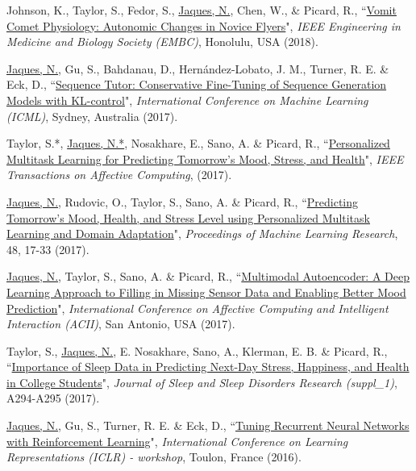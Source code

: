 \documentclass[paper=letter,fontsize=11pt]{scrartcl} %
\newcommand{\PaperEntry}[6]{
		\noindent #1, ``\href{#6}{#2}", \textit{#3}, #4 (#5).}
\begin{document}
\begin{etaremune}
\item \PaperEntry{Johnson, K., Taylor, S., Fedor, S., \underline{Jaques, N.}, Chen, W., \& Picard, R.}{Vomit Comet Physiology: Autonomic Changes in Novice Flyers}{IEEE Engineering in Medicine and Biology Society (EMBC)}{Honolulu, USA}{2018}{https://dspace.mit.edu/bitstream/handle/1721.1/123805/18.Johnson-etal_EMBC18_VomitComet.pdf?sequence=1&isAllowed=y}

\item \PaperEntry{\underline{Jaques, N.}, Gu, S., Bahdanau, D., Hern\'{a}ndez-Lobato, J. M., Turner, R. E. \& Eck, D.}{Sequence Tutor: Conservative Fine-Tuning of Sequence Generation Models with KL-control}{International Conference on Machine Learning (ICML)}{Sydney, Australia}{2017}{https://arxiv.org/pdf/1611.02796.pdf}

\item \PaperEntry{Taylor, S.*, \underline{Jaques, N.*}, Nosakhare, E., Sano, A. \& Picard, R.}{Personalized Multitask Learning for Predicting Tomorrow's Mood, Stress, and Health}{IEEE Transactions on Affective Computing}{}{2017}{https://www.media.mit.edu/publications/taffc-personalized-multitask-learning-for-predicting-tomorrow-s-mood-stress-and-health/}

\item \PaperEntry{\underline{Jaques, N.}, Rudovic, O., Taylor, S., Sano, A. \& Picard, R.}{Predicting Tomorrow’s Mood, Health, and Stress Level using Personalized Multitask Learning and Domain Adaptation}{Proceedings of Machine Learning Research}{48, 17-33}{2017}{http://proceedings.mlr.press/v66/jaques17a/jaques17a.pdf}

\item \PaperEntry{\underline{Jaques, N.}, Taylor, S., Sano, A. \& Picard, R.}{Multimodal Autoencoder: A Deep Learning Approach to Filling in Missing Sensor Data and Enabling Better Mood Prediction}{International Conference on Affective Computing and Intelligent Interaction (ACII)}{San Antonio, USA}{2017}{https://ieeexplore.ieee.org/document/8273601}

\item \PaperEntry{Taylor, S., \underline{Jaques, N.}, E. Nosakhare, Sano, A., Klerman, E. B. \& Picard, R.}{Importance of Sleep Data in Predicting Next-Day Stress, Happiness, and Health in College Students}{Journal of Sleep and Sleep Disorders Research (suppl\_1)}{A294-A295}{2017}{https://academic.oup.com/sleep/article-abstract/40/suppl_1/A294/3782233}

\item \PaperEntry{\underline{Jaques, N.}, Gu, S., Turner, R. E. \& Eck, D.}{Tuning Recurrent Neural Networks with Reinforcement Learning}{International Conference on Learning Representations (ICLR) - workshop}{Toulon, France}{2016}{https://openreview.net/pdf?id=Syyv2e-Kx}


\end{etaremune}
\end{document}
